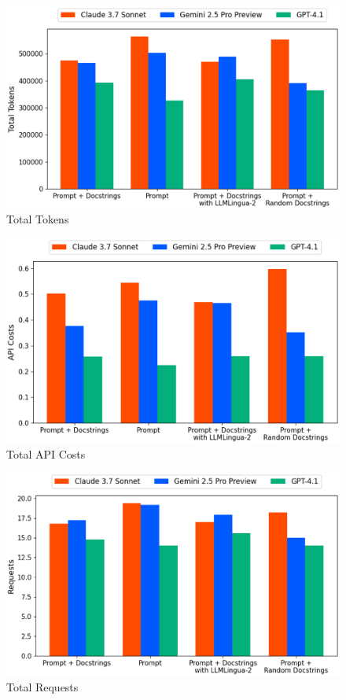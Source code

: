 \begin{figure}[htbp]
    \centering
    \includegraphics[width=0.9\linewidth]{imgs/eps/total_tokens_all.eps}
    \caption{Total Tokens}
    \label{fig:total_tokens}
\end{figure}

\begin{figure}[htbp]
    \centering
    \includegraphics[width=0.9\linewidth]{imgs/eps/total_api_costs_all.eps}
    \caption{Total API Costs}
    \label{fig:total_api_costs}
\end{figure}

\begin{figure}[htbp]
    \centering
    \includegraphics[width=0.9\linewidth]{imgs/eps/total_requests_all.eps}
    \caption{Total Requests}
    \label{fig:total_requests}
\end{figure}
